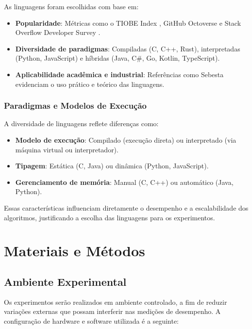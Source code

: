 \documentclass[12pt, a4paper]{article}
\begin{document}
As linguagens foram escolhidas com base em:

\begin{itemize}
    \item \textbf{Popularidade}: Métricas como o TIOBE Index , GitHub Octoverse  e Stack Overflow Developer Survey .
    \item \textbf{Diversidade de paradigmas}: Compiladas (C, C++, Rust), interpretadas (Python, JavaScript) e híbridas (Java, C\#, Go, Kotlin, TypeScript).
    \item \textbf{Aplicabilidade acadêmica e industrial}: Referências como Sebesta  evidenciam o uso prático e teórico das linguagens.
\end{itemize}

\subsubsection{Paradigmas e Modelos de Execução}

A diversidade de linguagens reflete diferenças como:

\begin{itemize}
    \item \textbf{Modelo de execução}: Compilado (execução direta) ou interpretado (via máquina virtual ou interpretador).
    \item \textbf{Tipagem}: Estática (C, Java) ou dinâmica (Python, JavaScript).
    \item \textbf{Gerenciamento de memória}: Manual (C, C++) ou automático (Java, Python).
\end{itemize}

Essas características influenciam diretamente o desempenho e a escalabilidade dos algoritmos, justificando a escolha das linguagens para os experimentos.


\section{Materiais e Métodos}

\subsection{Ambiente Experimental}

Os experimentos serão realizados em ambiente controlado, a fim de reduzir variações externas que possam interferir nas medições de desempenho. A configuração de hardware e software utilizada é a seguinte:
\end{document}
